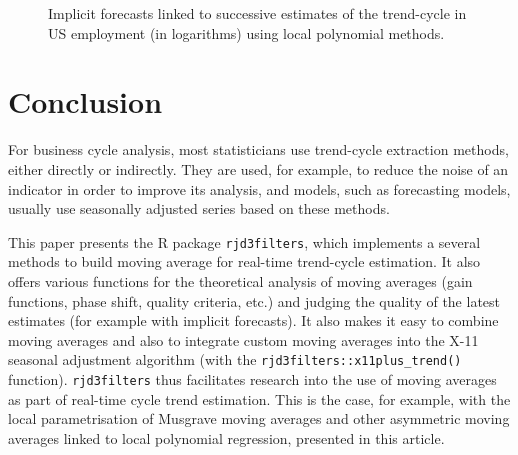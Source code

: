 \documentclass[
]{article}
\newcommand\1{\mathds{1}}
\begin{document}
\begin{figure}[H]

\caption{\label{fig-ce16ov-previmp-lp}Implicit forecasts linked to
successive estimates of the trend-cycle in US employment (in logarithms)
using local polynomial methods.}


\end{figure}%

\section{Conclusion}\label{conclusion}

For business cycle analysis, most statisticians use trend-cycle
extraction methods, either directly or indirectly. They are used, for
example, to reduce the noise of an indicator in order to improve its
analysis, and models, such as forecasting models, usually use seasonally
adjusted series based on these methods.

This paper presents the R package \texttt{rjd3filters}, which implements
a several methods to build moving average for real-time trend-cycle
estimation. It also offers various functions for the theoretical
analysis of moving averages (gain functions, phase shift, quality
criteria, etc.) and judging the quality of the latest estimates (for
example with implicit forecasts). It also makes it easy to combine
moving averages and also to integrate custom moving averages into the
X-11 seasonal adjustment algorithm (with the
\texttt{rjd3filters::x11plus\_trend()} function). \texttt{rjd3filters}
thus facilitates research into the use of moving averages as part of
real-time cycle trend estimation. This is the case, for example, with
the local parametrisation of Musgrave moving averages and other
asymmetric moving averages linked to local polynomial regression,
presented in this article.
\end{document}
